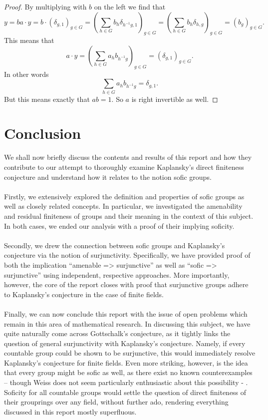 \documentclass[titlepage, a4paper]{article}
\theoremstyle{remark}
\begin{document}
\begin{proof}
		By multiplying with $b$ on the left we find that \[
			 y = ba\cdot y = b\cdot (\delta_{g, 1})_{g \in G} = \left( \sum_{h \in G} b_{h} \delta_{h^{-1}g, 1} \right)_{g \in G} = \left( \sum_{h \in G} b_{h} \delta_{h, g} \right)_{g \in G}
		 = \left( b_{g} \right) _{g \in G}.\] 
		This means that \[
		a\cdot y = \left( \sum_{h \in G} a_h b_{h^{-1}g} \right)_{g \in G} = \left( \delta_{g, 1} \right) _{g \in G} 
	.\] 
	In other words
	\[
	\sum_{h \in G} a_h b_{h^{-1}g} = \delta_{g, 1}
	.\]
	But this means exactly that $ab = 1$. So  $a$ is right invertible as well. 
	\end{proof}	
	
	\section{Conclusion}

We shall now briefly discuss the contents and results of this report and how they contribute to our attempt to thoroughly examine Kaplansky’s direct finiteness conjecture and understand how it relates to the notion sofic groups.\\
\\
Firstly, we extensively explored the definition and properties of sofic  groups as well as closely related concepts. In particular, we investigated the amenability and residual finiteness of groups and their meaning in the context of this subject. In both cases, we ended our analysis with a proof of their implying soficity. \\
\\
Secondly, we drew the connection between sofic groups and Kaplansky’s conjecture via the notion of surjunctivity. Specifically, we have provided proof of both the implication “amenable => surjunctive” as well as “sofic => surjunctive” using independent, respective approaches. More importantly, however, the core of the report closes with proof that surjunctive groups adhere to Kaplansky’s conjecture in the case of finite fields. \\
\\
Finally, we can now conclude this report with the issue of open problems which remain in this area of mathematical research. In discussing this subject, we have quite naturally come across Gottschalk’s conjecture, as it tightly links the question of general surjunctivity with Kaplansky’s conjecture. Namely, if every countable group could be shown to be surjunctive, this would immediately resolve Kaplansky’s conjecture for finite fields. Even more striking, however, is the idea that every group might be sofic as well, as there exist no known counterexamples – though Weiss does not seem particularly enthusiastic about this possibility \cite[introduction]{weiss_2000} -  . Soficity for all countable groups would settle the question of direct finiteness of their grouprings over any field, without further ado, rendering everything discussed in this report mostly superfluous.
\end{document}
